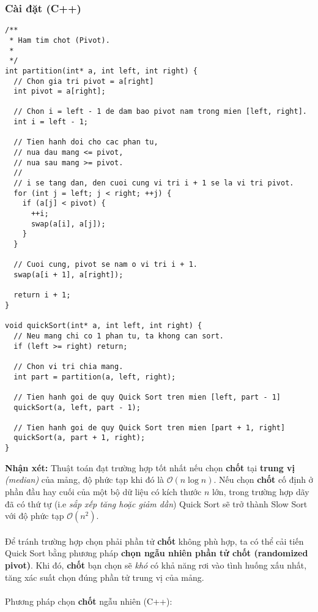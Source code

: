 \documentclass[]{article}
\begin{document}
\subsubsection{Cài đặt (C++)}
\begin{lstlisting}
/**
 * Ham tim chot (Pivot).
 *
 */
int partition(int* a, int left, int right) {
  // Chon gia tri pivot = a[right]
  int pivot = a[right];

  // Chon i = left - 1 de dam bao pivot nam trong mien [left, right].
  int i = left - 1;

  // Tien hanh doi cho cac phan tu,
  // nua dau mang <= pivot,
  // nua sau mang >= pivot.
  //
  // i se tang dan, den cuoi cung vi tri i + 1 se la vi tri pivot.
  for (int j = left; j < right; ++j) {
    if (a[j] < pivot) {
      ++i;
      swap(a[i], a[j]);
    }
  }

  // Cuoi cung, pivot se nam o vi tri i + 1.
  swap(a[i + 1], a[right]);

  return i + 1;
}

void quickSort(int* a, int left, int right) {
  // Neu mang chi co 1 phan tu, ta khong can sort.
  if (left >= right) return;

  // Chon vi tri chia mang.
  int part = partition(a, left, right);

  // Tien hanh goi de quy Quick Sort tren mien [left, part - 1]
  quickSort(a, left, part - 1);

  // Tien hanh goi de quy Quick Sort tren mien [part + 1, right]
  quickSort(a, part + 1, right);
}
\end{lstlisting}
\textbf{Nhận xét:} Thuật toán đạt trường hợp tốt nhất nếu chọn \textbf{chốt} tại \textbf{trung vị} \textit{(median)} của mảng, độ phức tạp khi đó là $\mathcal{O}(n \log n)$. Nếu chọn \textbf{chốt} cố định ở phần đầu hay cuối của một bộ dữ liệu có kích thước $n$ lớn, trong trường hợp dãy đã có thứ tự (i.e \textit{sắp xếp tăng hoặc giảm dần}) Quick Sort sẽ trở thành Slow Sort với độ phức tạp $\mathcal{O}(n^2)$.
\\\\
Để tránh trường hợp chọn phải phần tử \textbf{chốt} không phù hợp, ta có thể cải tiến Quick Sort bằng phương pháp \textbf{chọn ngẫu nhiên phần tử chốt (randomized pivot)}. Khi đó, \textbf{chốt} bạn chọn sẽ \textit{khó} có khả năng rơi vào tình huống xấu nhất, tăng xác suất chọn đúng phần tử trung vị của mảng. \cite{LMHoang}
\label{subsec:randompivot}
\\\\
Phương pháp chọn \textbf{chốt} ngẫu nhiên (C++):
\end{document}
